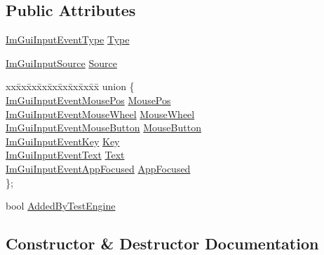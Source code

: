 \subsection*{Public Attributes}
\begin{DoxyCompactItemize}
\item 
\hyperlink{imgui__internal_8h_a8baf1d40f4b383b021ecbc6719a69aec}{Im\+Gui\+Input\+Event\+Type} \hyperlink{structImGuiInputEvent_a21d31c722ff155e2e8896a8012850acd}{Type}
\item 
\hyperlink{imgui__internal_8h_a8ee603a145a3a4f4ab5c93c8c8333b78}{Im\+Gui\+Input\+Source} \hyperlink{structImGuiInputEvent_a8780562e8dbed9ae613760399e8be8df}{Source}
\item 
\begin{tabbing}
xx\=xx\=xx\=xx\=xx\=xx\=xx\=xx\=xx\=\kill
union \{\\
\>\hyperlink{structImGuiInputEventMousePos}{ImGuiInputEventMousePos} \hyperlink{structImGuiInputEvent_aa5259390b6478192287966a5f87dd311}{MousePos}\\
\>\hyperlink{structImGuiInputEventMouseWheel}{ImGuiInputEventMouseWheel} \hyperlink{structImGuiInputEvent_aa0d1ebe2404e336b61d44fa95874093f}{MouseWheel}\\
\>\hyperlink{structImGuiInputEventMouseButton}{ImGuiInputEventMouseButton} \hyperlink{structImGuiInputEvent_a7e75a2c5682fc93bcded186ddb5ccfab}{MouseButton}\\
\>\hyperlink{structImGuiInputEventKey}{ImGuiInputEventKey} \hyperlink{structImGuiInputEvent_a7739f48af4f0fbad1ca79b5d9f82707e}{Key}\\
\>\hyperlink{structImGuiInputEventText}{ImGuiInputEventText} \hyperlink{structImGuiInputEvent_aae5e3f7f631cef154a0831e89f608655}{Text}\\
\>\hyperlink{structImGuiInputEventAppFocused}{ImGuiInputEventAppFocused} \hyperlink{structImGuiInputEvent_a74fbb441887d8a49f07df0d6dac48692}{AppFocused}\\
\}; \\

\end{tabbing}\item 
bool \hyperlink{structImGuiInputEvent_a87ff836d8c98d03adc91cdd592a13e0d}{Added\+By\+Test\+Engine}
\end{DoxyCompactItemize}


\subsection{Constructor \& Destructor Documentation}
\mbox{\label{structImGuiInputEvent_a0245c48f5f48b23defb78940c3a4a5ba}} 
